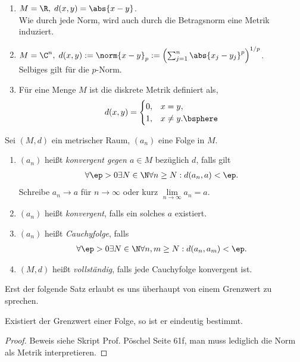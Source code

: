 \begin{bsp}
\label{bsp:1.3}
\begin{enumerate}
  \item $M=\R,\; d(x,y) = \abs{x-y}$.\\
  Wie durch jede Norm, wird auch durch die Betragsnorm eine Metrik induziert.  
  \item $M=\C^n,\; d(x,y) := \norm{x-y}_p := \left(\sum_{j=1}^n \abs{x_j-y_j}^p
  \right)^{1/p}$.\\
  Selbiges gilt für die $p$-Norm.
  \item Für eine Menge $M$ ist die diskrete Metrik definiert als,
  \begin{align*}
 d(x,y)= \begin{cases}0, & x=y,\\1, & x\neq y.\bsphere\end{cases}
  \end{align*}
\end{enumerate}
\end{bsp}

\begin{defn}
\label{def:1.4}
Sei $(M,d)$ ein metrischer Raum, $(a_n)$ eine Folge in $M$.
\begin{enumerate}
  \item $(a_n)$ heißt \emph{konvergent gegen $a\in M$} bezüglich $d$, falls gilt
\begin{align*}
\forall\ep>0\exists N \in\N\forall n\ge N : d(a_n,a) < \ep.
\end{align*}
Schreibe $a_n\to a$ für $n\to\infty$ oder kurz $\lim\limits_{n\to\infty} a_n =
a$. 
  \item $(a_n)$ heißt \emph{konvergent}, falls ein solches $a$ existiert.
  \item $(a_n)$ heißt \emph{Cauchyfolge}, falls
\begin{align*}
\forall \ep > 0 \exists N\in\N \forall n,m\ge N: d(a_n,a_m) < \ep.
\end{align*}
  \item  $(M,d)$ heißt \emph{vollständig}, falls jede Cauchyfolge
konvergent ist.\fishhere
\end{enumerate}
\end{defn}

Erst der folgende Satz erlaubt es uns überhaupt von einem Grenzwert zu sprechen.

\begin{propn}
Existiert der Grenzwert einer Folge, so ist er eindeutig bestimmt.\fishhere
\end{propn}
\begin{proof}
Beweis siehe Skript Prof. Pöschel Seite 61f, man muss lediglich die Norm als
Metrik interpretieren.\qedhere
\end{proof}

